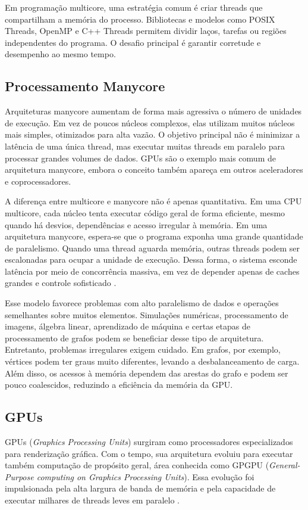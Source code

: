 Em programação multicore, uma estratégia comum é criar threads que compartilham a
memória do processo. Bibliotecas e modelos como POSIX Threads, OpenMP e C++
Threads permitem dividir laços, tarefas ou regiões independentes do programa. O
desafio principal é garantir corretude e desempenho ao mesmo tempo. 

\subsection{Processamento Manycore}

Arquiteturas manycore aumentam de forma mais agressiva o número de unidades de
execução. Em vez de poucos núcleos complexos, elas utilizam muitos núcleos mais
simples, otimizados para alta vazão. O objetivo principal não é minimizar a
latência de uma única thread, mas executar muitas threads em paralelo para
processar grandes volumes de dados. GPUs são o exemplo mais comum de arquitetura
manycore, embora o conceito também apareça em outros aceleradores e coprocessadores.

A diferença entre multicore e manycore não é apenas quantitativa. Em uma CPU
multicore, cada núcleo tenta executar código geral de forma eficiente, mesmo
quando há desvios, dependências e acesso irregular à memória. Em uma arquitetura
manycore, espera-se que o programa exponha uma grande quantidade de paralelismo.
Quando uma thread aguarda memória, outras threads podem ser escalonadas para
ocupar a unidade de execução. Dessa forma, o sistema esconde latência por meio de
concorrência massiva, em vez de depender apenas de caches grandes e controle
sofisticado \cite{kirkgpu}.

Esse modelo favorece problemas com alto paralelismo de dados e operações
semelhantes sobre muitos elementos. Simulações numéricas, processamento de
imagens, álgebra linear, aprendizado de máquina e certas etapas de processamento
de grafos podem se beneficiar desse tipo de arquitetura. Entretanto, problemas
irregulares exigem cuidado. Em grafos, por exemplo, vértices podem ter graus
muito diferentes, levando a desbalanceamento de carga. Além disso, os acessos à
memória dependem das arestas do grafo e podem ser pouco coalescidos, reduzindo a
eficiência da memória da GPU.

\subsection{GPUs}
GPUs (\textit{Graphics Processing Units}) surgiram como processadores
especializados para renderização gráfica. Com o tempo, sua arquitetura evoluiu
para executar também computação de propósito geral, área conhecida como GPGPU
(\textit{General-Purpose computing on Graphics Processing Units}). Essa evolução
foi impulsionada pela alta largura de banda de memória e pela capacidade de
executar milhares de threads leves em paralelo \cite{owensgpu, kirkgpu}.

